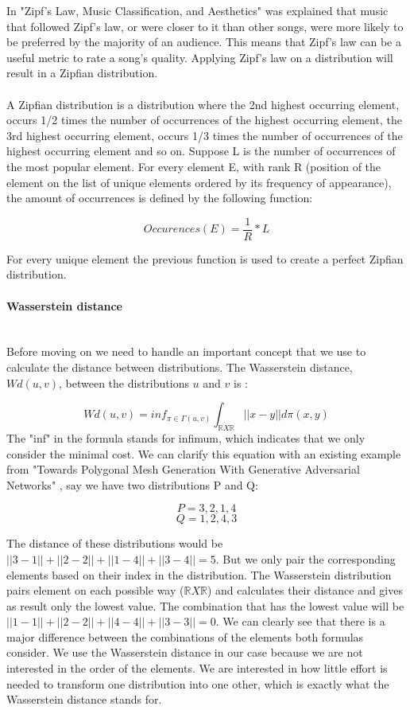 \documentclass[a4paper]{article}
\begin{document}
In "Zipf's Law, Music Classification, and Aesthetics" \cite{Zipfslaw_paper} was explained that music that followed Zipf's law, or were closer to it than other songs, were more likely to be preferred by the majority of an audience. This means that Zipf's law can be a useful metric to rate a song's quality. Applying Zipf's law on a distribution will result in a Zipfian distribution.
\\\\
A Zipfian distribution is a distribution where the 2nd highest occurring element, occurs 1/2 times the number of occurrences of the highest occurring element, the 3rd highest occurring element, occurs 1/3 times the number of occurrences of the highest occurring element and so on. Suppose L is the number of occurrences of the most popular element. For every element E, with rank R (position of the element on the list of unique elements ordered by its frequency of appearance), the amount of occurrences is defined by the following function:

\[ Occurences(E) =  \frac{1}{R} * L  \]

For every unique element the previous function is used to create a perfect Zipfian distribution.

\paragraph{Wasserstein distance}\mbox{}\\
Before moving on we need to handle an important concept that we use to calculate the distance between distributions. The Wasserstein distance, $Wd(u,v)$, between the distributions $ u $ and $ v $ is \cite{wasserstein_python}:


\[ Wd(u,v) =  inf_{\pi \in \Gamma (u,v)} \int_{\mathbb{R} X \mathbb{R} } ||x-y|| d\pi(x,y) \] 
The "inf" in the formula stands for infimum, which indicates that we only consider the minimal cost.
We can clarify this equation with an existing example from "Towards Polygonal Mesh Generation With
Generative Adversarial Networks" \cite{wasserstein_paper}, say we have two distributions P and Q: 

\[ P =  {3,2,1,4}  \]
\[ Q =  {1,2,4,3}  \]

The distance of these distributions would be $||3-1|| + ||2-2|| + ||1-4|| + ||3-4|| = 5$. But we only pair the corresponding elements based on their index in the distribution. The Wasserstein distribution pairs element on each possible way ($\mathbb{R} X \mathbb{R}$) and calculates their distance and gives as result only the lowest value. The combination that has the lowest value will be $||1-1|| + ||2-2|| + ||4-4|| + ||3-3|| = 0$. We can clearly see that there is a major difference between the combinations of the elements both formulas consider. We use the Wasserstein distance in our case because we are not interested in the order of the elements. We are interested in how little effort is needed to transform one distribution into one other, which is exactly what the Wasserstein distance stands for.
\end{document}
